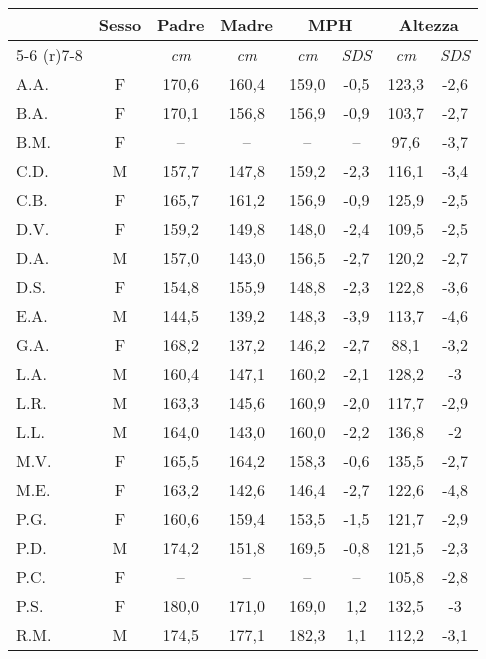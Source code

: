 \begin{table}[!h]
\begin{center}
\begin{tabular}{lccccccc}
\toprule
 & \multirow{2}{*}{Sesso} & 
   \multirow{2}{*}{Padre} & 
   \multirow{2}{*}{Madre} & 
   \multicolumn{2}{c}{MPH} &
   \multicolumn{2}{c}{Altezza} \\
 \cmidrule(r){5-6} \cmidrule(r){7-8}
 & & \emph{cm} & \emph{cm} & \emph{cm} & \emph{SDS}  &		\emph{cm}	& \emph{SDS}             	 \\

\midrule
A.A.	& F & 170,6 & 160,4 & 159,0 & -0,5 	 		& 123,3 & -2,6  \\
B.A.	& F & 170,1 & 156,8 & 156,9 & -0,9   			& 103,7 & -2,7   \\
B.M.	& F & --    & --    & --    & --     			&  97,6 & -3,7  \\
C.D.	& M & 157,7 & 147,8 & 159,2 & -2,3 	        	& 116,1 & -3,4  \\
C.B.	& F & 165,7 & 161,2 & 156,9 & -0,9 	 	        & 125,9 & -2,5  \\
D.V.	& F & 159,2 & 149,8 & 148,0 & -2,4   			& 109,5 & -2,5   \\
D.A.	& M & 157,0 & 143,0 & 156,5 & -2,7 	  		& 120,2 & -2,7  \\
D.S.	& F & 154,8 & 155,9 & 148,8 & -2,3   			& 122,8 & -3,6  \\
E.A.	& M & 144,5 & 139,2 & 148,3 & -3,9 	  		& 113,7 & -4,6  \\
G.A.	& F & 168,2 & 137,2 & 146,2 & -2,7 	  		&  88,1 & -3,2  \\
L.A.	& M & 160,4 & 147,1 & 160,2 & -2,1   			& 128,2 & -3    \\
L.R.	& M & 163,3 & 145,6 & 160,9 & -2,0 	  		& 117,7 & -2,9  \\
L.L.	& M & 164,0 & 143,0 & 160,0 & -2,2 	  		& 136,8 & -2     \\
M.V.	& F & 165,5 & 164,2 & 158,3 & -0,6   			& 135,5 & -2,7  \\
M.E.	& F & 163,2 & 142,6 & 146,4 & -2,7 	  		& 122,6 & -4,8  \\
P.G.	& F & 160,6 & 159,4 & 153,5 & -1,5   			& 121,7 & -2,9  \\
P.D.	& M & 174,2 & 151,8 & 169,5 & -0,8 	  		& 121,5 & -2,3  \\
P.C.	& F & --    & --    & --    & --   	  		& 105,8 & -2,8   \\
P.S.	& F & 180,0 & 171,0 & 169,0 & 1,2  	  		& 132,5 & -3    \\
R.M.	& M & 174,5 & 177,1 & 182,3 & 1,1    			& 112,2 & -3,1  \\

\end{tabular}
\end{center}
\end{table}
